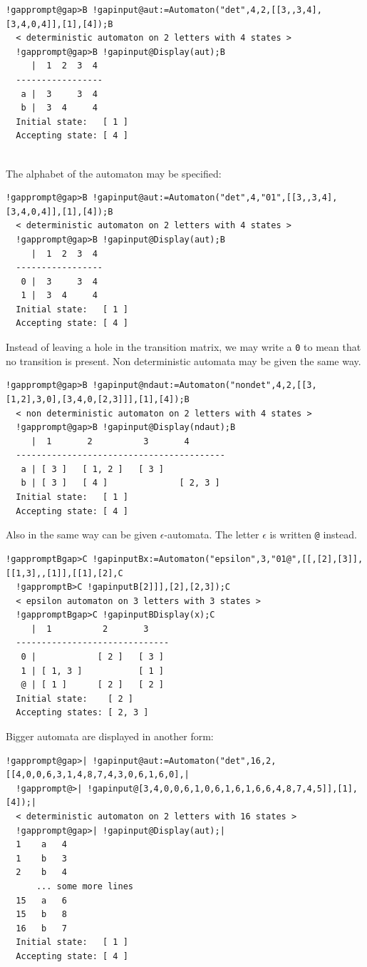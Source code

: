 \documentclass[a4paper,11pt]{report}
\begin{document}
{{{\begin{Verbatim}[commandchars=!@B,fontsize=\small,frame=single,label=Example]
  !gapprompt@gap>B !gapinput@aut:=Automaton("det",4,2,[[3,,3,4],[3,4,0,4]],[1],[4]);B
  < deterministic automaton on 2 letters with 4 states >
  !gapprompt@gap>B !gapinput@Display(aut);B
     |  1  2  3  4
  -----------------
   a |  3     3  4
   b |  3  4     4
  Initial state:   [ 1 ]
  Accepting state: [ 4 ]
  
\end{Verbatim}
 The alphabet of the automaton may be specified: 
\begin{Verbatim}[commandchars=!@B,fontsize=\small,frame=single,label=Example]
  !gapprompt@gap>B !gapinput@aut:=Automaton("det",4,"01",[[3,,3,4],[3,4,0,4]],[1],[4]);B
  < deterministic automaton on 2 letters with 4 states >
  !gapprompt@gap>B !gapinput@Display(aut);B
     |  1  2  3  4
  -----------------
   0 |  3     3  4
   1 |  3  4     4
  Initial state:   [ 1 ]
  Accepting state: [ 4 ]
\end{Verbatim}
 Instead of leaving a hole in the transition matrix, we may write a \texttt{0} to mean that no transition is present. Non deterministic automata may be given
the same way. 
\begin{Verbatim}[commandchars=!@B,fontsize=\small,frame=single,label=Example]
  !gapprompt@gap>B !gapinput@ndaut:=Automaton("nondet",4,2,[[3,[1,2],3,0],[3,4,0,[2,3]]],[1],[4]);B
  < non deterministic automaton on 2 letters with 4 states >
  !gapprompt@gap>B !gapinput@Display(ndaut);B
     |  1       2          3       4
  -----------------------------------------
   a | [ 3 ]   [ 1, 2 ]   [ 3 ]
   b | [ 3 ]   [ 4 ]              [ 2, 3 ]
  Initial state:   [ 1 ]
  Accepting state: [ 4 ]
\end{Verbatim}
 Also in the same way can be given $\epsilon$-automata. The letter $\epsilon$ is written \texttt{@} instead. 
\begin{Verbatim}[commandchars=!BC,fontsize=\small,frame=single,label=Example]
  !gappromptBgap>C !gapinputBx:=Automaton("epsilon",3,"01@",[[,[2],[3]],[[1,3],,[1]],[[1],[2],C
  !gappromptB>C !gapinputB[2]]],[2],[2,3]);C
  < epsilon automaton on 3 letters with 3 states >
  !gappromptBgap>C !gapinputBDisplay(x);C
     |  1          2       3
  ------------------------------
   0 |            [ 2 ]   [ 3 ]
   1 | [ 1, 3 ]           [ 1 ]
   @ | [ 1 ]      [ 2 ]   [ 2 ]
  Initial state:    [ 2 ]
  Accepting states: [ 2, 3 ]
\end{Verbatim}
 Bigger automata are displayed in another form: 
\begin{Verbatim}[commandchars=!@|,fontsize=\small,frame=single,label=Example]
  !gapprompt@gap>| !gapinput@aut:=Automaton("det",16,2,[[4,0,0,6,3,1,4,8,7,4,3,0,6,1,6,0],|
  !gapprompt@>| !gapinput@[3,4,0,0,6,1,0,6,1,6,1,6,6,4,8,7,4,5]],[1],[4]);|
  < deterministic automaton on 2 letters with 16 states >
  !gapprompt@gap>| !gapinput@Display(aut);|
  1    a   4
  1    b   3
  2    b   4
      ... some more lines
  15   a   6
  15   b   8
  16   b   7
  Initial state:   [ 1 ]
  Accepting state: [ 4 ]
\end{Verbatim}
 }

}}
\end{document}
